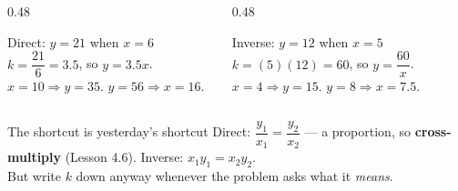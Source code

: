 \documentclass[aspectratio=169, 11pt]{beamer}
\begin{document}
\begin{frame}[t, plain]
  \begin{columns}[T]
    \begin{column}{0.48\textwidth}
      \begin{block}{Direct: $y=21$ when $x=6$}
        $k=\dfrac{21}{6}=3.5$, so $y=3.5x$. \\[4pt]
        $x=10 \Rightarrow y=35$. \quad $y=56 \Rightarrow x=16$.
      \end{block}
    \end{column}
    \begin{column}{0.48\textwidth}
      \begin{block}{Inverse: $y=12$ when $x=5$}
        $k=(5)(12)=60$, so $y=\dfrac{60}{x}$. \\[4pt]
        $x=4 \Rightarrow y=15$. \quad $y=8 \Rightarrow x=7.5$.
      \end{block}
    \end{column}
  \end{columns}
  \vspace{8pt}
  \begin{block}{The shortcut is yesterday's shortcut}
    \centering
    Direct: \; $\dfrac{y_1}{x_1}=\dfrac{y_2}{x_2}$ --- a proportion, so \textbf{cross-multiply}
    (Lesson 4.6). \qquad Inverse: \; $x_1y_1=x_2y_2$. \\[3pt]
    {\footnotesize But write $k$ down anyway whenever the problem asks what it \emph{means}.}
  \end{block}
\end{frame}
\end{document}
